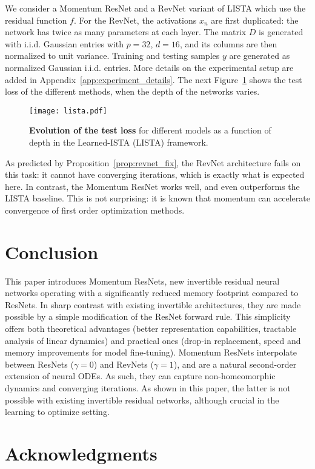 \documentclass{article}
\begin{document}
We consider a Momentum ResNet and a RevNet variant of LISTA which use the residual function $f$. For the RevNet, the activations $x_n$ are first duplicated: the network has twice as many parameters at each layer.
The matrix $D$ is generated with i.i.d. Gaussian entries with  $p=32$, $d=16$, and its columns are then normalized to unit variance.
Training and testing samples $y$ are generated as normalized Gaussian i.i.d. entries. More details on the experimental setup are added in Appendix~\ref{app:experiment_details}. 
The next Figure~\ref{fig:lista} shows the test loss of the different methods, when the depth of the networks varies.
\begin{figure}[H]
\centering
\texttt{[image: lista.pdf]} 
\caption{\textbf{Evolution of the test loss} for different models as a function of depth in the Learned-ISTA (LISTA) framework.}
\label{fig:lista}
\end{figure}
As predicted by Proposition~\ref{prop:revnet_fix}, the RevNet architecture fails on this task: it cannot have converging iterations, which is exactly what is expected here.
In contrast, the Momentum ResNet works well, and even outperforms the LISTA baseline.
This is not surprising: it is known that momentum can accelerate convergence of first order optimization methods.
\vspace{-1em}
\section*{Conclusion}

This paper introduces Momentum ResNets, new invertible residual neural networks operating with a significantly reduced memory footprint compared to ResNets. In sharp contrast with existing invertible architectures, they are made possible by a simple modification of the ResNet forward rule. This simplicity offers both theoretical advantages (better representation capabilities, tractable analysis of linear dynamics) and practical ones (drop-in replacement, speed and memory improvements for model fine-tuning). Momentum ResNets interpolate between ResNets ($\gamma=0$) and RevNets ($\gamma=1$), and are a natural second-order extension of neural ODEs. As such, they can capture non-homeomorphic dynamics and converging iterations. As shown in this paper, the latter is not possible with existing invertible residual networks, although crucial in the learning to optimize setting.
\vspace{-2em}
\section*{Acknowledgments}
\end{document}
